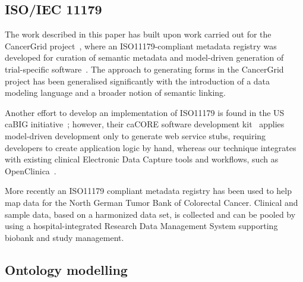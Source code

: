\documentclass[a4paper,twoside]{article}
\begin{document}
\subsection{ISO/IEC 11179}

The work described in this paper has built upon work carried out for the CancerGrid project~\cite{davi14}, where an ISO11179-compliant metadata registry was developed for curation of semantic metadata and model-driven generation of trial-specific software~\cite{davi12, Abler2011}.  The approach to generating forms in the CancerGrid project has been generalised significantly with the introduction of a data modeling language and a broader notion of semantic linking. 

Another effort to develop an implementation of ISO11179 is found in the US caBIG initiative~\cite{kunz09}; however, their caCORE software development kit~\cite{koma08} applies model-driven development only to
generate web service stubs, requiring developers to create application
logic by hand, whereas our technique integrates with existing clinical
Electronic Data Capture tools and workflows, such as
OpenClinica~\cite{oc}. 

More recently an ISO11179 compliant metadata registry \cite{MDRHL7} has been used to help map data for the North German Tumor Bank of Colorectal Cancer. Clinical and sample data, based on a harmonized data set, is collected and can be pooled by using a hospital-integrated Research Data Management System supporting biobank and study management.

\subsection{Ontology modelling}

\end{document}
